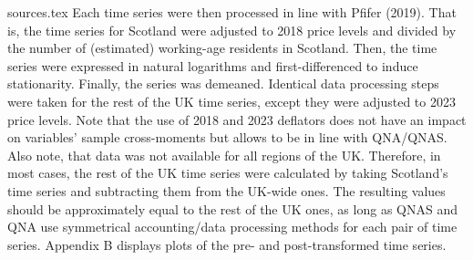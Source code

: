 {sources.tex}
Each time series were then processed in line with Pfifer (2019). That is, the time series for Scotland were adjusted to 2018 price levels and divided by the number of (estimated) working-age residents in Scotland. Then, the time series were expressed in natural logarithms and first-differenced to induce stationarity. Finally, the series was demeaned. Identical data processing steps were taken for the rest of the UK time series, except they were adjusted to 2023 price levels. Note that the use of 2018 and 2023 deflators does not have an impact on variables' sample cross-moments but allows to be in line with QNA/QNAS. Also note, that data was not available for all regions of the UK. Therefore, in most cases, the rest of the UK time series were calculated by taking Scotland's time series and subtracting them from the UK-wide ones. The resulting values should be approximately equal to the rest of the UK ones, as long as QNAS and QNA use symmetrical accounting/data processing methods for each pair of time series. Appendix B displays plots of the pre- and post-transformed time series.